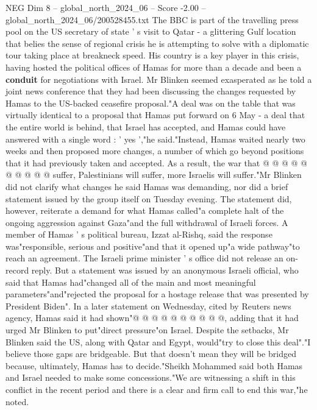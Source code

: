 \begin{textsample}{NEG Dim 8 – global\_north\_2024\_06 – Score -2.00 – global\_north\_2024\_06/200528455.txt}  \label{ex:f8_neg_191}
The BBC is part of the travelling press pool on the US secretary of state ' s visit to Qatar - a glittering Gulf location that belies the sense of regional crisis he is attempting to solve with a diplomatic tour taking place at breakneck speed.
His country is a key player in this crisis, having hosted the political offices of Hamas for more than a decade and been a \textbf{conduit} for negotiations with Israel.
Mr Blinken seemed exasperated as he told a joint news conference that they had been discussing the changes requested by Hamas to the US-backed ceasefire proposal."A deal was on the table that was virtually identical to a proposal that Hamas put forward on 6 May - a deal that the entire world is behind, that Israel has accepted, and Hamas could have answered with a single word : ' yes ',"he said."Instead, Hamas waited nearly two weeks and then proposed more changes, a number of which go beyond positions that it had previously taken and accepted.
As a result, the war that @ @ @ @ @ @ @ @ @ @ suffer, Palestinians will suffer, more Israelis will suffer."Mr Blinken did not clarify what changes he said Hamas was demanding, nor did a brief statement issued by the group itself on Tuesday evening.
The statement did, however, reiterate a demand for what Hamas called"a complete halt of the ongoing aggression against Gaza"and the full withdrawal of Israeli forces.
A member of Hamas ' s political bureau, Izzat al-Rishq, said the response was"responsible, serious and positive"and that it opened up"a wide pathway"to reach an agreement.
The Israeli prime minister ' s office did not release an on-record reply.
But a statement was issued by an anonymous Israeli official, who said that Hamas had"changed all of the main and most meaningful parameters"and"rejected the proposal for a hostage release that was presented by President Biden".
In a later statement on Wednesday, cited by Reuters news agency, Hamas said it had shown"@ @ @ @ @ @ @ @ @ @, adding that it had urged Mr Blinken to put"direct pressure"on Israel.
Despite the setbacks, Mr Blinken said the US, along with Qatar and Egypt, would"try to close this deal"."I believe those gaps are bridgeable.
But that doesn't mean they will be bridged because, ultimately, Hamas has to decide."Sheikh Mohammed said both Hamas and Israel needed to make some concessions."We are witnessing a shift in this conflict in the recent period and there is a clear and firm call to end this war,"he noted.

\end{textsample}
